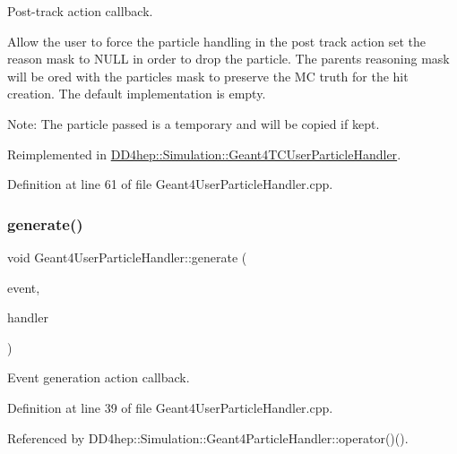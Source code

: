 Post-\/track action callback. 

Allow the user to force the particle handling in the post track action set the reason mask to N\+U\+LL in order to drop the particle. The parent\textquotesingle{}s reasoning mask will be or\textquotesingle{}ed with the particle\textquotesingle{}s mask to preserve the MC truth for the hit creation. The default implementation is empty.

Note\+: The particle passed is a temporary and will be copied if kept. 

Reimplemented in \hyperlink{class_d_d4hep_1_1_simulation_1_1_geant4_t_c_user_particle_handler_a1578be1e99f7f70c9d332cffb1ad2504}{D\+D4hep\+::\+Simulation\+::\+Geant4\+T\+C\+User\+Particle\+Handler}.



Definition at line 61 of file Geant4\+User\+Particle\+Handler.\+cpp.

\hypertarget{class_d_d4hep_1_1_simulation_1_1_geant4_user_particle_handler_abd7d1f82639f33dd16563c4beb936c9e}{}\label{class_d_d4hep_1_1_simulation_1_1_geant4_user_particle_handler_abd7d1f82639f33dd16563c4beb936c9e} 
\subsubsection{\texorpdfstring{generate()}{generate()}}
{\footnotesize\ttfamily void Geant4\+User\+Particle\+Handler\+::generate (\begin{DoxyParamCaption}\item[{G4\+Event $\ast$}]{event,  }\item[{\hyperlink{class_d_d4hep_1_1_simulation_1_1_geant4_particle_handler}{Geant4\+Particle\+Handler} $\ast$}]{handler }\end{DoxyParamCaption})\hspace{0.3cm}{\ttfamily [virtual]}}



Event generation action callback. 



Definition at line 39 of file Geant4\+User\+Particle\+Handler.\+cpp.



Referenced by D\+D4hep\+::\+Simulation\+::\+Geant4\+Particle\+Handler\+::operator()().

